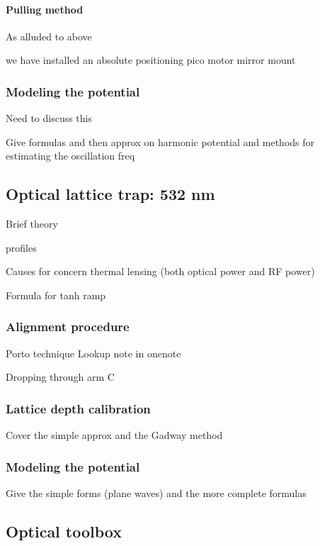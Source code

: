 \paragraph{Pulling method}

As alluded to above

we have installed an absolute positioning pico motor mirror mount 

\subsubsection{Modeling the potential} \label{sssec:1064_modeling}

Need to discuss this

Give formulas and then approx on harmonic potential and methods for estimating the oscillation freq

\subsection{Optical lattice trap: 532 nm} \label{ssec:532sys}

Brief theory

profiles

Causes for concern
	thermal lensing (both optical power and RF power)
	
Formula for tanh ramp

\subsubsection{Alignment procedure} \label{sssec:532_align}

Porto technique
Lookup note in onenote

Dropping through arm C

\subsubsection{Lattice depth calibration} \label{sssec:532_lattice_depth}

Cover the simple approx and the Gadway method

\subsubsection{Modeling the potential} \label{sssec:532_modeling}

Give the simple forms (plane waves) and the more complete formulas

\subsection{Optical toolbox} \label{ssec:op_tools}

